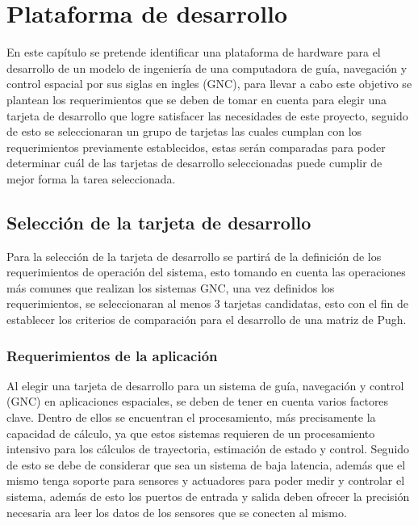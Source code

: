 \chapter{Plataforma de desarrollo}
\label{ch:especifico1}

En este capítulo se pretende identificar una plataforma de hardware para el desarrollo de un modelo de ingeniería de una computadora de guía, navegación y control espacial por sus siglas en ingles (GNC), para llevar a cabo este objetivo se plantean los requerimientos que se deben de tomar en cuenta para elegir una tarjeta de desarrollo que logre satisfacer las necesidades de este proyecto, seguido de esto se seleccionaran un grupo de tarjetas las cuales cumplan con los requerimientos previamente establecidos, estas serán comparadas para poder determinar cuál de las tarjetas de desarrollo seleccionadas puede cumplir de mejor forma la tarea seleccionada.

\section{Selección de la tarjeta de desarrollo}
    Para la selección de la tarjeta de desarrollo se partirá de la definición de los requerimientos de operación del sistema, esto tomando en cuenta las operaciones más comunes que realizan los sistemas GNC, una vez definidos los requerimientos, se seleccionaran al menos 3 tarjetas candidatas, esto con el fin de establecer los criterios de comparación para el desarrollo de una matriz de Pugh.

\subsection{Requerimientos de la aplicación}

Al elegir una tarjeta de desarrollo para un sistema de guía, navegación y control (GNC) en aplicaciones espaciales, se deben de tener en cuenta varios factores clave. Dentro de ellos se encuentran el procesamiento, más precisamente la capacidad de cálculo, ya que estos sistemas requieren de un procesamiento intensivo para los cálculos de trayectoria, estimación de estado y control. Seguido de esto se debe de considerar que sea un sistema de baja latencia, además que el mismo tenga soporte para sensores y actuadores para poder medir y controlar el sistema, además de esto los puertos de entrada y salida deben ofrecer la precisión necesaria ara leer los datos de los sensores que se conecten al mismo.

